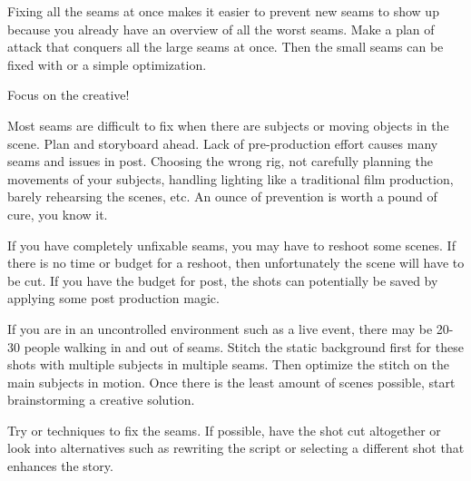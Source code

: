 \begin{fullwidth}

Fixing all the seams at once makes it easier to prevent new seams to show up because you already have an overview of all the worst seams. Make a plan of attack that conquers all the large seams at once. Then the small seams can be fixed with \textbf{} or a simple optimization.


{\large Focus on the creative! \par}

Most seams are difficult to fix when there are subjects or moving objects in the scene. Plan and storyboard ahead. Lack of pre-production effort causes many seams and issues in post. Choosing the wrong rig, not carefully planning the movements of your subjects, handling lighting like a traditional film production, barely rehearsing the scenes, etc. An ounce of prevention is worth a pound of cure, you know it. 

If you have completely unfixable seams, you may have to reshoot some scenes. If there is no time or budget for a reshoot, then unfortunately the scene will have to be cut. If you have the budget for post, the shots can potentially be saved by applying some post production magic. 

If you are in an uncontrolled environment such as a live event, there may be 20-30 people walking in and out of seams. Stitch the static background first for these shots with multiple subjects in multiple seams. Then optimize the stitch on the main subjects in motion. Once there is the least amount of scenes possible, start brainstorming a creative solution. 




Try \textbf{} or \textbf{} techniques to fix the seams. If possible, have the shot cut altogether or look into alternatives such as rewriting the script or selecting a different shot that enhances the story.

\clearpage
\end{fullwidth}